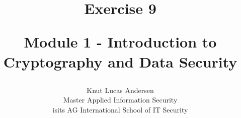 \title{ 
	\begin{center} \textbf{ Exercise 9 } \end{center}
	\begin{center} {\large Module 1 - Introduction to Cryptography and Data Security } \end{center}
}

\author{ 
	Knut Lucas Andersen \\
	Master Applied Information Security \\
	isits AG International School of IT Security
}